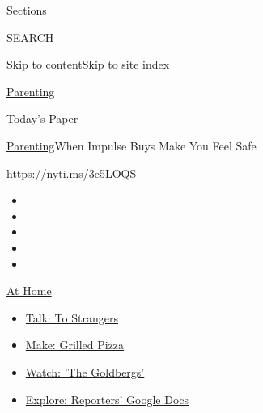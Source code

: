 Sections

SEARCH

\protect\hyperlink{site-content}{Skip to
content}\protect\hyperlink{site-index}{Skip to site index}

\href{https://www.nytimes3xbfgragh.onion/section/parenting}{Parenting}

\href{https://myaccount.nytimes3xbfgragh.onion/auth/login?response_type=cookie\&client_id=vi}{}

\href{https://www.nytimes3xbfgragh.onion/section/todayspaper}{Today's
Paper}

\href{/section/parenting}{Parenting}\textbar{}When Impulse Buys Make You
Feel Safe

\href{https://nyti.ms/3e5LOQS}{https://nyti.ms/3e5LOQS}

\begin{itemize}
\item
\item
\item
\item
\item
\end{itemize}

\href{https://www.nytimes3xbfgragh.onion/spotlight/at-home?action=click\&pgtype=Article\&state=default\&region=TOP_BANNER\&context=at_home_menu}{At
Home}

\begin{itemize}
\tightlist
\item
  \href{https://www.nytimes3xbfgragh.onion/2020/08/03/well/family/the-benefits-of-talking-to-strangers.html?action=click\&pgtype=Article\&state=default\&region=TOP_BANNER\&context=at_home_menu}{Talk:
  To Strangers}
\item
  \href{https://www.nytimes3xbfgragh.onion/2020/08/01/at-home/coronavirus-make-pizza-on-a-grill.html?action=click\&pgtype=Article\&state=default\&region=TOP_BANNER\&context=at_home_menu}{Make:
  Grilled Pizza}
\item
  \href{https://www.nytimes3xbfgragh.onion/2020/07/31/arts/television/goldbergs-abc-stream.html?action=click\&pgtype=Article\&state=default\&region=TOP_BANNER\&context=at_home_menu}{Watch:
  'The Goldbergs'}
\item
  \href{https://www.nytimes3xbfgragh.onion/interactive/2020/at-home/even-more-reporters-editors-diaries-lists-recommendations.html?action=click\&pgtype=Article\&state=default\&region=TOP_BANNER\&context=at_home_menu}{Explore:
  Reporters' Google Docs}
\end{itemize}

